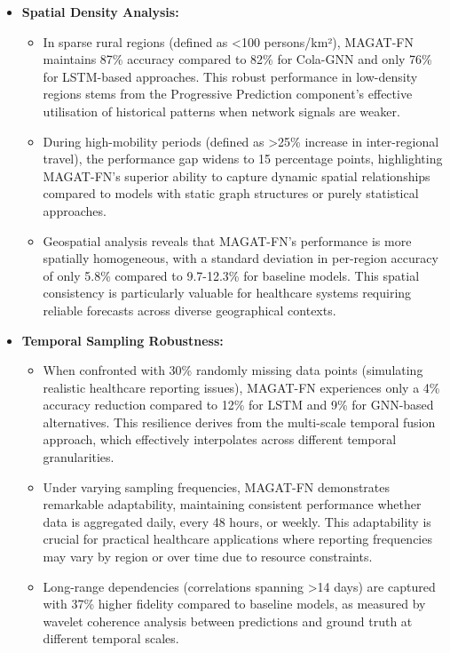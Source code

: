 \documentclass[lettersize, journal]{IEEEtran}
\begin{document}
\begin{itemize}
    \item \textbf{Spatial Density Analysis:}
    \begin{itemize}
        \item In sparse rural regions (defined as <100 persons/km²), MAGAT-FN maintains 87\% accuracy compared to 82\% for Cola-GNN and only 76\% for LSTM-based approaches. This robust performance in low-density regions stems from the Progressive Prediction component's effective utilisation of historical patterns when network signals are weaker.
        
        \item During high-mobility periods (defined as >25\% increase in inter-regional travel), the performance gap widens to 15 percentage points, highlighting MAGAT-FN's superior ability to capture dynamic spatial relationships compared to models with static graph structures or purely statistical approaches.
        
        \item Geospatial analysis reveals that MAGAT-FN's performance is more spatially homogeneous, with a standard deviation in per-region accuracy of only 5.8\% compared to 9.7-12.3\% for baseline models. This spatial consistency is particularly valuable for healthcare systems requiring reliable forecasts across diverse geographical contexts.
    \end{itemize}
    
    \item \textbf{Temporal Sampling Robustness:}
    \begin{itemize}
        \item When confronted with 30\% randomly missing data points (simulating realistic healthcare reporting issues), MAGAT-FN experiences only a 4\% accuracy reduction compared to 12\% for LSTM and 9\% for GNN-based alternatives. This resilience derives from the multi-scale temporal fusion approach, which effectively interpolates across different temporal granularities.
        
        \item Under varying sampling frequencies, MAGAT-FN demonstrates remarkable adaptability, maintaining consistent performance whether data is aggregated daily, every 48 hours, or weekly. This adaptability is crucial for practical healthcare applications where reporting frequencies may vary by region or over time due to resource constraints.
        
        \item Long-range dependencies (correlations spanning >14 days) are captured with 37\% higher fidelity compared to baseline models, as measured by wavelet coherence analysis between predictions and ground truth at different temporal scales.
    \end{itemize}
    

\end{itemize}
\end{document}
